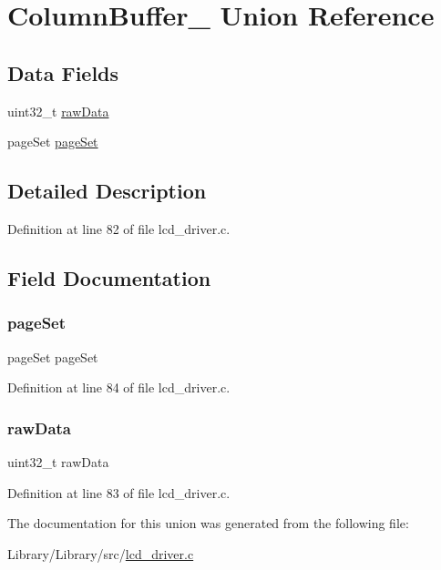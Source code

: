 \hypertarget{union_column_buffer__}{}\section{Column\+Buffer\+\_\+ Union Reference}
\label{union_column_buffer__}
\subsection*{Data Fields}
\begin{DoxyCompactItemize}
\item 
uint32\+\_\+t \mbox{\hyperlink{union_column_buffer___a582fa2ca99b13c0df79f2fd2445ac31e}{raw\+Data}}
\item 
page\+Set \mbox{\hyperlink{union_column_buffer___a7e95b3d635528dfbaee7b3ea7b305277}{page\+Set}}
\end{DoxyCompactItemize}


\subsection{Detailed Description}


Definition at line 82 of file lcd\+\_\+driver.\+c.



\subsection{Field Documentation}
\mbox{\label{union_column_buffer___a7e95b3d635528dfbaee7b3ea7b305277}} 
\subsubsection{\texorpdfstring{page\+Set}{pageSet}}
{\footnotesize\ttfamily page\+Set page\+Set}



Definition at line 84 of file lcd\+\_\+driver.\+c.

\mbox{\label{union_column_buffer___a582fa2ca99b13c0df79f2fd2445ac31e}} 
\subsubsection{\texorpdfstring{raw\+Data}{rawData}}
{\footnotesize\ttfamily uint32\+\_\+t raw\+Data}



Definition at line 83 of file lcd\+\_\+driver.\+c.



The documentation for this union was generated from the following file\+:\begin{DoxyCompactItemize}
\item 
Library/\+Library/src/\mbox{\hyperlink{lcd__driver_8c}{lcd\+\_\+driver.\+c}}\end{DoxyCompactItemize}
